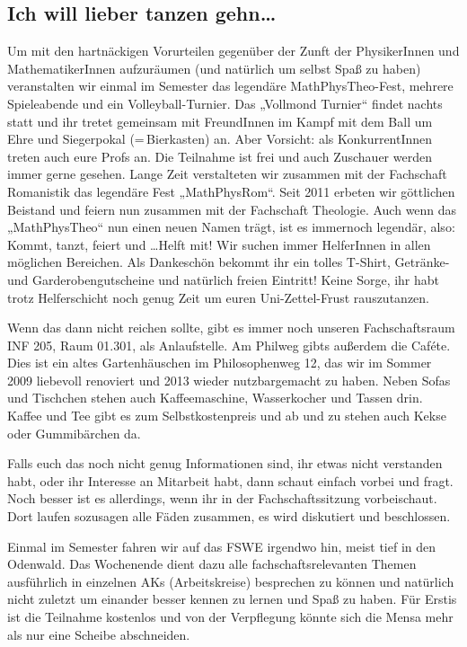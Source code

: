 \subsection*{Ich will lieber tanzen gehn\dots}
Um mit den hartnäckigen Vorurteilen gegenüber der Zunft der PhysikerInnen und MathematikerInnen aufzuräumen (und natürlich um selbst Spaß zu haben) veranstalten wir einmal im Semester das legendäre MathPhysTheo-Fest, mehrere Spieleabende und ein Volleyball-Turnier.
Das „Vollmond Turnier“ findet nachts statt und ihr tretet gemeinsam mit FreundInnen im Kampf mit dem Ball um Ehre und Siegerpokal (=\,Bierkasten) an. Aber Vorsicht: als KonkurrentInnen treten auch eure Profs an. Die Teilnahme ist frei und auch Zuschauer werden immer gerne gesehen.
Lange Zeit verstalteten wir zusammen mit der Fachschaft Romanistik das legendäre Fest „MathPhysRom“. Seit 2011 erbeten wir göttlichen Beistand und feiern nun zusammen mit der Fachschaft Theologie. Auch wenn das „MathPhysTheo“ nun einen neuen Namen trägt, ist es immernoch legendär, also: Kommt, tanzt, feiert und \dots Helft mit! Wir suchen immer HelferInnen in allen möglichen Bereichen. Als Dankeschön bekommt ihr ein tolles T-Shirt, Getränke- und Garderobengutscheine und natürlich freien Eintritt! Keine Sorge, ihr habt trotz Helferschicht noch genug Zeit um euren Uni-Zettel-Frust rauszutanzen.

Wenn das dann nicht reichen sollte, gibt es immer noch unseren Fachschaftsraum INF 205, Raum 01.301, als Anlaufstelle.
Am Philweg gibts außerdem die Caféte. Dies ist ein altes Gartenhäuschen im Philosophenweg 12, das wir im Sommer 2009 liebevoll renoviert und 2013 wieder nutzbargemacht zu haben. Neben Sofas und Tischchen stehen auch Kaffeemaschine, Wasserkocher und Tassen drin. Kaffee und Tee gibt es zum Selbstkostenpreis und ab und zu stehen auch Kekse oder Gummibärchen da.

Falls euch das noch nicht genug Informationen sind, ihr etwas nicht verstanden habt, oder ihr Interesse an Mitarbeit habt, dann schaut einfach vorbei und fragt. Noch besser ist es allerdings, wenn ihr in der Fachschaftssitzung vorbeischaut. Dort laufen sozusagen alle Fäden zusammen, es wird diskutiert und beschlossen.

Einmal im Semester fahren wir auf das \gls{FSWE} irgendwo hin, meist tief in den Odenwald. Das Wochenende dient dazu alle fachschaftsrelevanten Themen ausführlich in einzelnen AKs (Arbeitskreise) besprechen zu können und natürlich nicht zuletzt um einander besser kennen zu lernen und Spaß zu haben. Für Erstis ist die Teilnahme kostenlos und von der Verpflegung könnte sich die Mensa mehr als nur eine Scheibe abschneiden.
